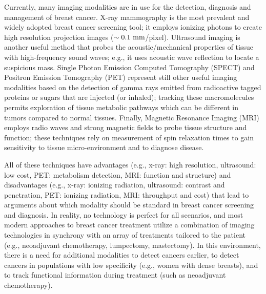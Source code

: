 Currently, many imaging modalities are in use for the detection, diagnosis and management of breast cancer. X-ray mammography is the most prevalent and widely adopted breast cancer screening tool; it employs ionizing photons to create high resolution projection images ($\sim0.1~\rm{mm}$/pixel). Ultrasound imaging is another useful method that probes the acoustic/mechanical properties of tissue with high-frequency sound waves; e.g., it uses acoustic wave reflection to locate a suspicious mass. Single Photon Emission Computed Tomography (SPECT) and Positron Emission Tomography (PET) represent still other useful imaging modalities based on the detection of gamma rays emitted from radioactive tagged proteins or sugars that are injected (or inhaled); tracking these macromolecules permits exploration of tissue metabolic pathways which can be different in tumors compared to normal tissues. Finally, Magnetic Resonance Imaging (MRI) employs radio waves and strong magnetic fields to probe tissue structure and function; these techniques rely on measurement of spin relaxation times to gain sensitivity to tissue micro-environment and to diagnose disease. 

All of these techniques have advantages (e.g., x-ray: high resolution, ultrasound: low cost, PET: metabolism detection, MRI: function and structure) and disadvantages (e.g., x-ray: ionizing radiation, ultrasound: contrast and penetration, PET: ionizing radiation, MRI: throughput and cost) that lead to arguments about which modality should be standard in breast cancer screening and diagnosis. In reality, no technology is perfect for all scenarios, and most modern approaches to breast cancer treatment utilize a combination of imaging technologies in synchrony with an array of treatments tailored to the patient (e.g., neoadjuvant chemotherapy, lumpectomy, mastectomy). In this environment, there is a need for additional modalities to detect cancers earlier, to detect cancers in populations with low specificity (e.g., women with dense breasts), and to track functional information during treatment (such as neoadjuvant chemotherapy).

